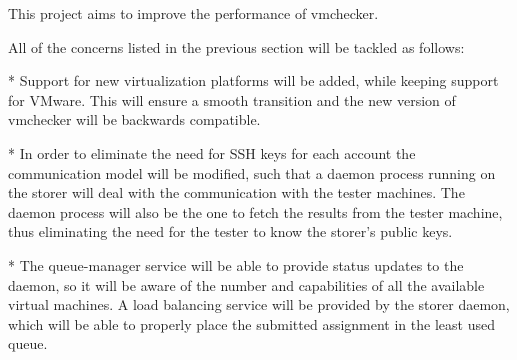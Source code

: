 This project aims to improve the performance of vmchecker. 

All of the concerns listed in the previous section will be tackled as follows:

* Support for new virtualization platforms will be added, while keeping support
for VMware. This will ensure a smooth transition and the new version of vmchecker
will be backwards compatible.

* In order to eliminate the need for SSH keys for each account the communication
model will be modified, such that a daemon process running on the storer will
deal with the communication with the tester machines. The daemon process will also
be the one to fetch the results from the tester machine, thus eliminating the need
for the tester to know the storer's public keys.

* The queue-manager service will be able to provide status updates to the daemon,
so it will be aware of the number and capabilities of all the available virtual
machines. A load balancing service will be provided by the storer daemon, which
will be able to properly place the submitted assignment in the least used queue.
